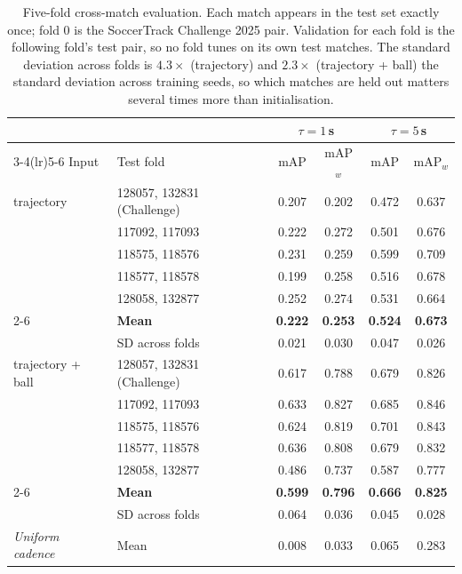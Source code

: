 \begin{table}[t]
  \centering
  \caption{Five-fold cross-match evaluation. Each match appears in the test set exactly once; fold 0 is the SoccerTrack Challenge 2025 pair. Validation for each fold is the following fold's test pair, so no fold tunes on its own test matches. The standard deviation across folds is $4.3\times$ (trajectory) and $2.3\times$ (trajectory {+} ball) the standard deviation across training seeds, so which matches are held out matters several times more than initialisation.}
  \label{tab:bas_cv}
  \small
  \begin{tabular}{llcccc}
    \toprule
    & & \multicolumn{2}{c}{$\tau = 1\,$s} & \multicolumn{2}{c}{$\tau = 5\,$s} \\
    \cmidrule(lr){3-4}\cmidrule(lr){5-6}
    Input & Test fold & mAP & mAP$_w$ & mAP & mAP$_w$ \\
    \midrule
    trajectory & 128057, 132831\,(Challenge) & 0.207 & 0.202 & 0.472 & 0.637 \\
     & 117092, 117093 & 0.222 & 0.272 & 0.501 & 0.676 \\
     & 118575, 118576 & 0.231 & 0.259 & 0.599 & 0.709 \\
     & 118577, 118578 & 0.199 & 0.258 & 0.516 & 0.678 \\
     & 128058, 132877 & 0.252 & 0.274 & 0.531 & 0.664 \\
    \cmidrule(lr){2-6}
    & \textbf{Mean} & \textbf{0.222} & \textbf{0.253} & \textbf{0.524} & \textbf{0.673} \\
    & SD across folds & 0.021 & 0.030 & 0.047 & 0.026 \\
    \midrule
    trajectory + ball & 128057, 132831\,(Challenge) & 0.617 & 0.788 & 0.679 & 0.826 \\
     & 117092, 117093 & 0.633 & 0.827 & 0.685 & 0.846 \\
     & 118575, 118576 & 0.624 & 0.819 & 0.701 & 0.843 \\
     & 118577, 118578 & 0.636 & 0.808 & 0.679 & 0.832 \\
     & 128058, 132877 & 0.486 & 0.737 & 0.587 & 0.777 \\
    \cmidrule(lr){2-6}
    & \textbf{Mean} & \textbf{0.599} & \textbf{0.796} & \textbf{0.666} & \textbf{0.825} \\
    & SD across folds & 0.064 & 0.036 & 0.045 & 0.028 \\
    \midrule
    \textit{Uniform cadence} & Mean & 0.008 & 0.033 & 0.065 & 0.283 \\
    \bottomrule
  \end{tabular}
\end{table}
